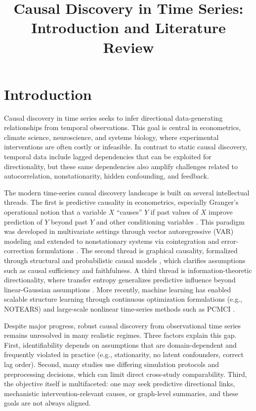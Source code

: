 \documentclass[11pt]{article}
\title{Causal Discovery in Time Series: Introduction and Literature Review}
\author{}
\date{}
\begin{document}
\maketitle
\onehalfspacing

\section{Introduction}
Causal discovery in time series seeks to infer directional data-generating relationships from temporal observations. This goal is central in econometrics, climate science, neuroscience, and systems biology, where experimental interventions are often costly or infeasible. In contrast to static causal discovery, temporal data include lagged dependencies that can be exploited for directionality, but these same dependencies also amplify challenges related to autocorrelation, nonstationarity, hidden confounding, and feedback.

The modern time-series causal discovery landscape is built on several intellectual threads. The first is predictive causality in econometrics, especially Granger's operational notion that a variable $X$ ``causes'' $Y$ if past values of $X$ improve prediction of $Y$ beyond past $Y$ and other conditioning variables \citep{granger1969}. This paradigm was developed in multivariate settings through vector autoregressive (VAR) modeling \citep{sims1980,lutkepohl2005} and extended to nonstationary systems via cointegration and error-correction formulations \citep{engle1987}. The second thread is graphical causality, formalized through structural and probabilistic causal models \citep{pearl2000,spirtes2000,peters2017}, which clarifies assumptions such as causal sufficiency and faithfulness. A third thread is information-theoretic directionality, where transfer entropy generalizes predictive influence beyond linear-Gaussian assumptions \citep{schreiber2000}. More recently, machine learning has enabled scalable structure learning through continuous optimization formulations (e.g., NOTEARS) \citep{zheng2018} and large-scale nonlinear time-series methods such as PCMCI \citep{runge2019}.

Despite major progress, robust causal discovery from observational time series remains unresolved in many realistic regimes. Three factors explain this gap. First, identifiability depends on assumptions that are domain-dependent and frequently violated in practice (e.g., stationarity, no latent confounders, correct lag order). Second, many studies use differing simulation protocols and preprocessing decisions, which can limit direct cross-study comparability. Third, the objective itself is multifaceted: one may seek predictive directional links, mechanistic intervention-relevant causes, or graph-level summaries, and these goals are not always aligned.
\end{document}
